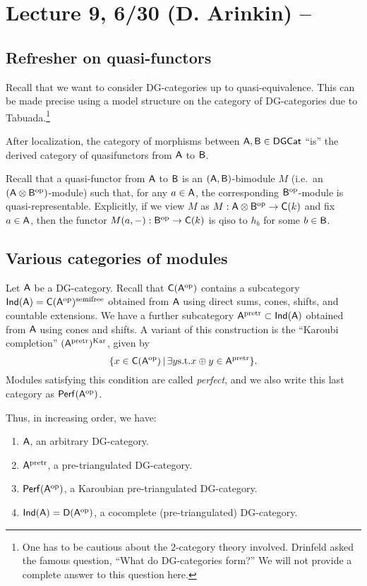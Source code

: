 \documentclass{amsart}
\begin{document}
\section{Lecture 9, 6/30 (D. Arinkin) -- }

\subsection{Refresher on quasi-functors}

Recall that we want to consider DG-categories up to quasi-equivalence.
This can be made precise using a model structure on the category of DG-categories due to Tabuada.\footnote{One has to be cautious about the $2$-category theory involved.
Drinfeld asked the famous question, ``What do DG-categories form?''
We will not provide a complete answer to this question here.}

\begin{thm}[To\"en]
	After localization, the category of morphisms between $\mathsf{A}, \mathsf{B} \in \mathsf{DGCat}$ ``is'' the derived category of quasifunctors from $\mathsf{A}$ to $\mathsf{B}$.
\end{thm}

Recall that a quasi-functor from $\mathsf{A}$ to $\mathsf{B}$ is an $(\mathsf{A}, \mathsf{B})$-bimodule $M$ (i.e.\ an $(\mathsf{A} \otimes \mathsf{B}^{\mathrm{op}})$-module) such that, for any $a \in \mathsf{A}$, the corresponding $\mathsf{B}^{\mathrm{op}}$-module is quasi-representable.
Explicitly, if we view $M$ as $M: \mathsf{A} \otimes \mathsf{B}^{\mathrm{op}} \to \mathsf{C}(k)$ and fix $a \in \mathsf{A}$, then the functor $M(a, -): \mathsf{B}^{\mathrm{op}} \to \mathsf{C}(k)$ is qiso to $h_b$ for some $b \in \mathsf{B}$.

\subsection{Various categories of modules}

Let $\mathsf{A}$ be a DG-category.
Recall that $\mathsf{C}(\mathsf{A}^{\mathrm{op}})$ contains a subcategory $\mathsf{Ind}(\mathsf{A}) = \mathsf{C}(\mathsf{A}^{\mathrm{op}})^{\mathrm{semifree}}$ obtained from $\mathsf{A}$ using direct sums, cones, shifts, and countable extensions.
We have a further subcategory $\mathsf{A}^{\mathrm{pretr}} \subset \mathsf{Ind}(\mathsf{A})$ obtained from $\mathsf{A}$ using cones and shifts.
A variant of this construction is the ``Karoubi completion'' $(\mathsf{A}^{\mathrm{pretr}})^{\mathrm{Kar}}$, given by
\[
	\{ x \in \mathsf{C}(\mathsf{A}^{\mathrm{op}}) \, | \, \exists y \textrm{s.t.} x \oplus y \in \mathsf{A}^{\mathrm{pretr}} \}.
\]
Modules satisfying this condition are called \emph{perfect}, and we also write this last category as $\mathsf{Perf}(\mathsf{A}^{\mathrm{op}})$.

Thus, in increasing order, we have:
\begin{enumerate}
	\item $\mathsf{A}$, an arbitrary DG-category.
	\item $\mathsf{A}^{\mathrm{pretr}}$, a pre-triangulated DG-category.
	\item $\mathsf{Perf}(\mathsf{A}^{\mathrm{op}})$, a Karoubian pre-triangulated DG-category.
	\item $\mathsf{Ind}(\mathsf{A}) = \mathsf{D}(\mathsf{A}^{\mathrm{op}})$, a cocomplete (pre-triangulated) DG-category.
\end{enumerate}
\end{document}
